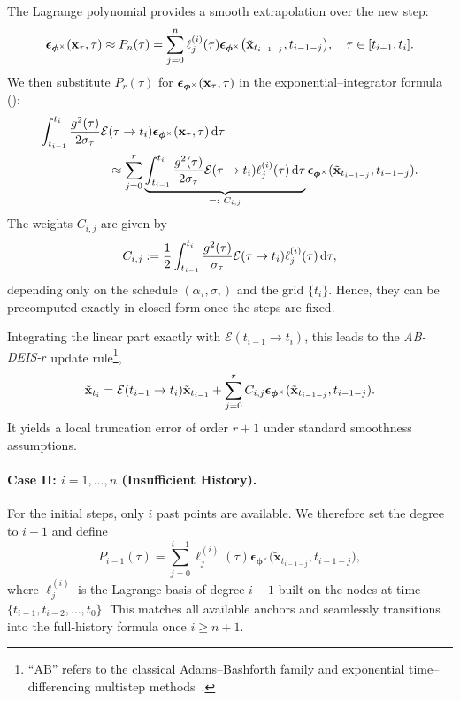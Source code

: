 The Lagrange polynomial provides a smooth extrapolation over the new step:
\[
\bm{\epsilon}_{\bm{\phi}^\times}({\mathbf{x}}_\tau,\tau) \approx
P_n(\tau)=\sum_{j=0}^{n}\ell_j^{(i)}(\tau) 
\bm{\epsilon}_{\bm{\phi}^\times}\bigl(\tilde{{\mathbf{x}}}_{t_{i-1-j}}, t_{i-1-j}\bigr), 
\quad \tau \in [t_{i-1},t_i].
\]
We then substitute $P_r(\tau)$ for ${\bm{\epsilon}}_{\bm{\phi}^\times}({\mathbf{x}}_\tau,\tau)$ in the
exponential–integrator formula ():
\begin{align*}
    \int_{t_{i-1}}^{t_i}
\frac{g^2(\tau)}{2 \sigma_\tau} 
\mathcal{E}&(\tau\to t_i) 
{\bm{\epsilon}}_{\bm{\phi}^\times}({\mathbf{x}}_\tau,\tau)\mathop{}\!\mathrm{d}\tau
\\&\approx\sum_{j=0}^{r}
\underbrace{\int_{t_{i-1}}^{t_i}
\frac{g^2(\tau)}{2 \sigma_\tau} 
\mathcal{E}(\tau\to t_i) 
\ell_j^{(i)}(\tau)\mathop{}\!\mathrm{d}\tau}_{=:~C_{i,j}} 
{\bm{\epsilon}}_{\bm{\phi}^\times}(\tilde{{\mathbf{x}}}_{t_{i-1-j}},t_{i-1-j}).
\end{align*}
The weights $C_{i,j}$ are given by
\begin{equation*}
C_{i,j} := \frac{1}{2} \int_{t_{i-1}}^{t_i} \frac{g^2(\tau)}{\sigma_\tau} \mathcal{E}(\tau \to t_i) \ell_j^{(i)}(\tau) \mathop{}\!\mathrm{d}\tau,
\end{equation*}
depending only on the schedule $(\alpha_\tau,\sigma_\tau)$ and the grid
$\{t_i\}$. Hence, they can be precomputed exactly in closed form once the steps are fixed.

Integrating the linear part exactly with $\mathcal{E}(t_{i-1}\to t_i)$, this leads to the \emph{AB-DEIS-$r$} update rule\footnote{``AB'' refers to the classical
Adams–Bashforth family and exponential time–differencing multistep methods~\citep{hochbruck2010exponential}.},
\[
\tilde{{\mathbf{x}}}_{t_i}
=
\mathcal{E}(t_{i-1}\to t_i) \tilde{{\mathbf{x}}}_{t_{i-1}}
+
\sum_{j=0}^{r} C_{i,j} 
{\bm{\epsilon}}_{\bm{\phi}^\times}(\tilde{{\mathbf{x}}}_{t_{i-1-j}},t_{i-1-j}).
\]
It yields a local truncation
error of order $r{+}1$ under standard smoothness assumptions.




\paragraph{Case II: $i=1,\dots,n$ (Insufficient History).}
For the initial steps, only $i$ past points are available. We therefore set the degree to $i{-}1$ and define
\[
P_{i-1}(\tau)
=
\sum_{j=0}^{i-1}
\ell_j^{(i)}(\tau) 
\bm{\epsilon}_{\bm{\phi}^\times}\bigl(\tilde{\mathbf x}_{t_{i-1-j}},  t_{i-1-j}\bigr),
\]
where $\ell_j^{(i)}$ is the Lagrange basis of degree $i{-}1$ built on the nodes at time
$\{t_{i-1}, t_{i-2},\ldots,t_{0}\}$. This matches all available anchors and
seamlessly transitions into the full‐history formula once $i\ge n{+}1$.

